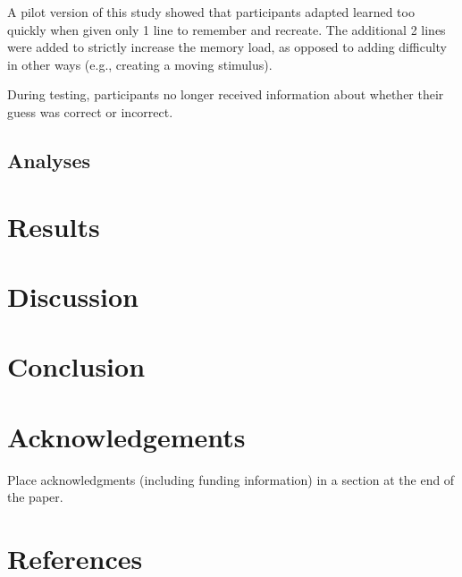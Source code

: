 \documentclass[10pt, letterpaper]{article}
\begin{document}
A pilot version of this study showed that participants adapted learned
too quickly when given only 1 line to remember and recreate. The
additional 2 lines were added to strictly increase the memory load, as
opposed to adding difficulty in other ways (e.g., creating a moving
stimulus).

During testing, participants no longer received information about
whether their guess was correct or incorrect.

\subsection{Analyses}\label{analyses}

\section{Results}\label{results}

\section{Discussion}\label{discussion}

\section{Conclusion}\label{conclusion}

\section{Acknowledgements}\label{acknowledgements}

Place acknowledgments (including funding information) in a section at
the end of the paper.

\section{References}\label{references}

\setlength{\parindent}{-0.1in} \setlength{\leftskip}{0.125in} \noindent
\end{document}
